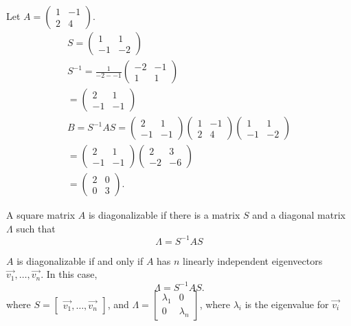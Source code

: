 \begin{eg}
  Let $A=\begin{pmatrix} 1&-1\\2&4 \end{pmatrix} $.
  \begin{align*}
    S=\begin{pmatrix} 1&1\\-1&-2 \end{pmatrix} \\
    S^{-1}=\frac{1}{-2--1}\begin{pmatrix} -2&-1\\1&1 \end{pmatrix} \\
    =\begin{pmatrix} 2&1\\-1&-1 \end{pmatrix} \\
    B=S^{-1}AS=\begin{pmatrix} 2&1\\-1&-1 \end{pmatrix} \begin{pmatrix} 1&-1\\2&4 \end{pmatrix} \begin{pmatrix} 1&1\\-1&-2 \end{pmatrix} \\
    = \begin{pmatrix} 2&1\\-1&-1 \end{pmatrix} \begin{pmatrix} 2&3\\-2&-6 \end{pmatrix} \\
    =\begin{pmatrix} 2&0\\0&3 \end{pmatrix} 
  .\end{align*}
\end{eg}
\begin{definition}
  A square matrix $A$ is diagonalizable if there is a matrix $S$ and a diagonal matrix $\Lambda$ such that 
  \begin{equation*}
    \Lambda = S^{-1}AS
  \end{equation*}
\end{definition}
\begin{theorem}
  $A$ is diagonalizable if and only if $A$ has $n$ linearly independent eigenvectors $\vec{v_1},\ldots,\vec{v_n}$. In this case, \[
  \Lambda = S^{-1}AS
  .\] where $S=\begin{bmatrix} \vec{v_1},\ldots,\vec{v_n} \end{bmatrix} $, and $\Lambda=\begin{bmatrix} \lambda_1&0\\0&\lambda_n \end{bmatrix} $, where $\lambda_i$ is the eigenvalue for $\vec{v_i}$
\end{theorem}
